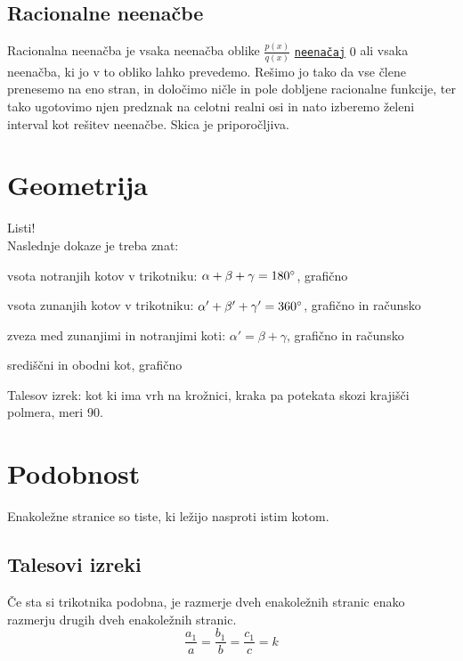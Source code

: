 \documentclass[a4paper,oneside,12pt,fleqn]{article}
\def\deg{\degree}
\numberwithin{equation}{section}
\newenvironment{enumerate*}%
{
\vspace{-12pt}%
\begin{enumerate}%
\setlength{\itemsep}{0pt}%
\setlength{\parskip}{2pt}}%
{\end{enumerate}}
\begin{document}
\subsection{Racionalne neenačbe}
\label{sec:neenac:rac}
Racionalna neenačba je vsaka neenačba oblike $\frac{p(x)}{q(x)}$
\hyperlink{point:neenacaj}{\texttt{neenačaj}} $0$ ali
vsaka neenačba, ki jo v to obliko lahko prevedemo. Rešimo jo
tako da vse člene prenesemo na eno stran, in določimo ničle in pole dobljene racionalne
funkcije, ter tako ugotovimo njen predznak na celotni realni
osi in nato izberemo želeni interval kot rešitev neenačbe. Skica je priporočljiva.

\section{Geometrija}
\label{sec:geom}
Listi!\\
Naslednje dokaze je treba znat:
\begin{enumerate*}
  \item vsota notranjih kotov v trikotniku: $\alpha + \beta + \gamma = 180\deg$, grafično
  \item vsota zunanjih kotov v trikotniku: $\alpha' + \beta' + \gamma' = 360\deg$, grafično in računsko
  \item zveza med zunanjimi in notranjimi koti: $\alpha' = \beta + \gamma$, grafično in
    računsko \label{enum:geom:notrzun}
  \item središčni in obodni kot, grafično
  \item Talesov izrek: kot ki ima vrh na krožnici, kraka pa potekata skozi krajišči
    polmera, meri 90\deg.
\end{enumerate*}

\section{Podobnost}
\label{sec:podob}
Enakoležne stranice so tiste, ki ležijo nasproti istim kotom.

\subsection{Talesovi izreki}
\label{sec:podob:tales}
Če sta si trikotnika podobna, je razmerje dveh enakoležnih stranic enako razmerju drugih
dveh enakoležnih stranic.
\begin{equation}
  \frac{a_1}{a} = \frac{b_1}{b} = \frac{c_1}{c} = k 
  \label{eq:podob:tal1}
\end{equation}
\end{document}
